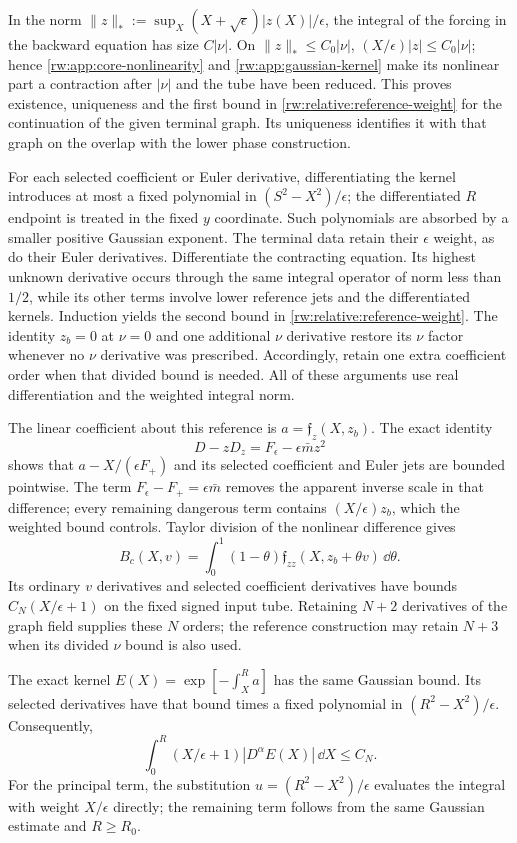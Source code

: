 In the norm
$\|z\|_*:=\sup_X(X+\sqrt\epsilon)|z(X)|/\epsilon$,
the integral of the forcing in the backward equation has size
$C|\nu|$. On $\|z\|_*\le C_0|\nu|$,
$(X/\epsilon)|z|\le C_0|\nu|$; hence
\eqref{rw:app:core-nonlinearity} and
\eqref{rw:app:gaussian-kernel} make its nonlinear part a contraction
after $|\nu|$ and the tube have been reduced. This proves existence,
uniqueness and the first bound in
\eqref{rw:relative:reference-weight} for the continuation of the
given terminal graph. Its uniqueness identifies it with that graph
on the overlap with the lower phase construction.

For each selected coefficient or Euler derivative, differentiating
the kernel introduces at most a fixed polynomial in
$(S^2-X^2)/\epsilon$; the differentiated $R$ endpoint is treated
in the fixed $y$ coordinate. Such polynomials are absorbed by a
smaller positive Gaussian exponent. The terminal data retain their
$\epsilon$ weight, as do their Euler derivatives. Differentiate the
contracting equation. Its highest unknown derivative occurs through
the same integral operator of norm less than $1/2$, while its other
terms involve lower reference jets and the differentiated kernels.
Induction yields the second bound in
\eqref{rw:relative:reference-weight}. The identity $z_b=0$ at
$\nu=0$ and one additional $\nu$ derivative restore its $\nu$
factor whenever no $\nu$ derivative was prescribed. Accordingly,
retain one extra coefficient order when that divided bound is needed.
All of these arguments use real differentiation and the weighted
integral norm.

The linear coefficient about this reference is
$a=\mathfrak f_z(X,z_b)$. The exact identity
\[
 D-zD_z=F_\epsilon-\epsilon\bar m z^2
\]
shows that
$a-X/(\epsilon F_+)$ and its selected coefficient and Euler
jets are bounded pointwise. The term $F_\epsilon-F_+=\epsilon\bar m$
removes the apparent inverse scale in that difference; every remaining
dangerous term contains $(X/\epsilon)z_b$, which the weighted bound
controls. Taylor division of the nonlinear difference gives
\[
 B_c(X,v)=\int_0^1(1-\theta)
           \mathfrak f_{zz}(X,z_b+\theta v)\,\dd\theta.
\]
Its ordinary $v$ derivatives and selected coefficient derivatives
have bounds $C_N(X/\epsilon+1)$ on the fixed signed input tube.
Retaining $N+2$ derivatives of the graph field supplies these $N$
orders; the reference construction may retain $N+3$ when its divided
$\nu$ bound is also used.

The exact kernel $E(X)=\exp[-\int_X^R a]$ has the same Gaussian
bound. Its selected derivatives have that bound times a fixed
polynomial in $(R^2-X^2)/\epsilon$. Consequently,
\begin{equation}\label{rw:app:normalized-kernel-bound}
 \int_0^R (X/\epsilon+1)|D^\alpha E(X)|\,\dd X\le C_N.
\end{equation}
For the principal term, the substitution
$u=(R^2-X^2)/\epsilon$ evaluates the integral with weight
$X/\epsilon$ directly; the remaining term follows from the same
Gaussian estimate and $R\ge R_0$.

